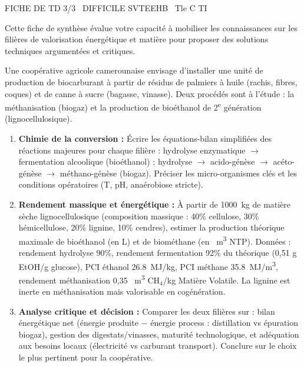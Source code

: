 \documentclass[11pt]{article}
\begin{document}
\begin{tcolorbox}[enhanced,colback=popink,colframe=popink,arc=10pt,boxrule=0pt,left=12pt,right=12pt,top=9pt,bottom=9pt]
{\color{white}\popxbold\small FICHE DE TD 3/3 \textbullet\ DIFFICILE \hfill SVTEEHB \textbullet\ Tle C TI\par}
\end{tcolorbox}
\vspace{4pt}
\noindent Cette fiche de synthèse évalue votre capacité à mobiliser les connaissances sur les filières de valorisation énergétique et matière pour proposer des solutions techniques argumentées et critiques.

\begin{exercice}
Une coopérative agricole camerounaise envisage d'installer une unité de production de biocarburant à partir de résidus de palmiers à huile (rachis, fibres, coques) et de canne à sucre (bagasse, vinasse). Deux procédés sont à l'étude : la méthanisation (biogaz) et la production de bioéthanol de 2\textsuperscript{e} génération (lignocellulosique).
\begin{enumerate}
    \item \textbf{Chimie de la conversion :} Écrire les équations-bilan simplifiées des réactions majeures pour chaque filière : hydrolyse enzymatique $\rightarrow$ fermentation alcoolique (bioéthanol) ; hydrolyse $\rightarrow$ acido-génèse $\rightarrow$ acéto-génèse $\rightarrow$ méthano-génèse (biogaz). Préciser les micro-organismes clés et les conditions opératoires (T, pH, anaérobiose stricte).
    \item \textbf{Rendement massique et énergétique :} À partir de \SI{1000}{kg} de matière sèche lignocellulosique (composition massique : 40\% cellulose, 30\% hémicellulose, 20\% lignine, 10\% cendres), estimer la production théorique maximale de bioéthanol (en L) et de biométhane (en \SI{}{m^3} NTP). Données : rendement hydrolyse 90\%, rendement fermentation 92\% du théorique (0,51 g EtOH/g glucose), PCI éthanol \SI{26,8}{MJ/kg}, PCI méthane \SI{35,8}{MJ/m^3}, rendement méthanisation 0,35 \SI{}{m^3} CH$_4$/kg Matière Volatile. La lignine est inerte en méthanisation mais valorisable en cogénération.
    \item \textbf{Analyse critique et décision :} Comparer les deux filières sur : bilan énergétique net (énergie produite $-$ énergie process : distillation vs épuration biogaz), gestion des digestats/vinasses, maturité technologique, et adéquation aux besoins locaux (électricité vs carburant transport). Conclure sur le choix le plus pertinent pour la coopérative.
\end{enumerate}
\end{exercice}
\end{document}
